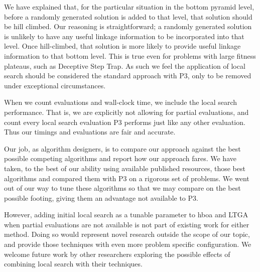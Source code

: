 \documentclass[]{article}
\begin{document}
We have explained that, for the particular situation in the bottom pyramid level,
before a randomly generated solution is added to that level, that solution should be hill climbed.
Our reasoning is straightforward; a randomly generated solution is unlikely to
have any useful linkage information to be incorporated into that level.
Once hill-climbed, that solution is more likely to provide useful linkage information to that bottom level.
This is true even for problems with large fitness plateaus, such as Deceptive Step Trap.
As such we feel the application of local search should be considered the standard approach
with P3, only to be removed under exceptional circumstances.

When we count evaluations and wall-clock time, we include the local search performance. That is, we are explicitly not allowing for partial evaluations, and count every local search evaluation P3 performs just like any other evaluation. Thus our timings and evaluations are fair and accurate.

Our job, as algorithm designers, is to compare our approach against the best possible competing algorithms
and report how our approach fares. We have taken, to the best of our ability using available published resources,
those best algorithms and compared them with P3 on a rigorous set of problems.
We went out of our way to tune these algorithms
so that we may compare on the best possible footing, giving them an advantage not available to P3.

However, adding initial local search as a tunable parameter to hboa and LTGA when partial evaluations are not available is not part
of existing work for either method. Doing so would represent novel research outside the scope of our topic, and provide those techniques
with even more problem specific configuration. We welcome future work by other researchers exploring the possible effects of combining
local search with their techniques.
\end{document}
